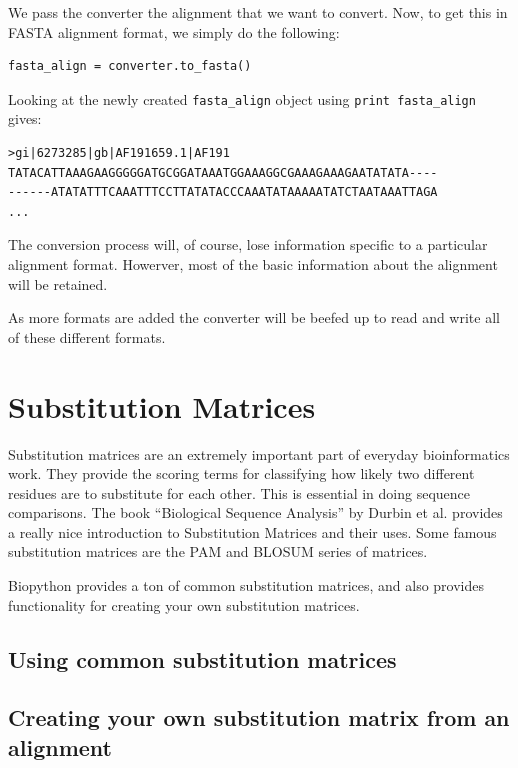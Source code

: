 \documentclass{report}
\begin{document}
We pass the converter the alignment that we want to convert. Now, to get this in FASTA alignment format, we simply do the following:

\begin{verbatim}
fasta_align = converter.to_fasta()
\end{verbatim}

Looking at the newly created \verb|fasta_align| object using \verb|print fasta_align| gives:

\begin{verbatim}
>gi|6273285|gb|AF191659.1|AF191
TATACATTAAAGAAGGGGGATGCGGATAAATGGAAAGGCGAAAGAAAGAATATATA----
------ATATATTTCAAATTTCCTTATATACCCAAATATAAAAATATCTAATAAATTAGA
...
\end{verbatim}

The conversion process will, of course, lose information specific to a particular alignment format. Howerver, most of the basic information about the alignment will be retained.

As more formats are added the converter will be beefed up to read and write all of these different formats.

\section{Substitution Matrices}
\label{sec:sub_matrix}

Substitution matrices are an extremely important part of everyday bioinformatics work. They provide the scoring terms for classifying how likely two different residues are to substitute for each other. This is essential in doing sequence comparisons. The book ``Biological Sequence Analysis'' by Durbin et al. provides a really nice introduction to Substitution Matrices and their uses. Some famous substitution matrices are the PAM and BLOSUM series of matrices.

Biopython provides a ton of common substitution matrices, and also provides functionality for creating your own substitution matrices.

\subsection{Using common substitution matrices}

\subsection{Creating your own substitution matrix from an alignment}
\label{sec:subs_mat_ex}
\end{document}
